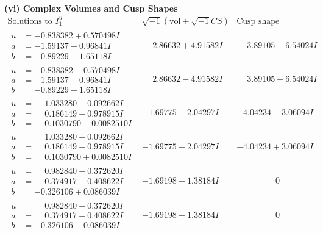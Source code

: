 \documentclass[1p]{elsarticle_modified}
\theoremstyle{definition}
\newcommand{\I}{\sqrt{-1}}
\begin{document}
\newpage\flushleft \textbf{(vi) Complex Volumes and Cusp Shapes}
$$\begin{array}{c|c|c}  
\text{Solutions to }I^u_{1}& \I (\text{vol} + \sqrt{-1}CS) & \text{Cusp shape}\\
 \hline 
\begin{aligned}
u &= -0.838382 + 0.570498 I \\
a &= -1.59137 + 0.96841 I \\
b &= -0.89229 + 1.65118 I\end{aligned}
 & \phantom{-}2.86632 + 4.91582 I & \phantom{-}3.89105 - 6.54024 I \\ \hline\begin{aligned}
u &= -0.838382 - 0.570498 I \\
a &= -1.59137 - 0.96841 I \\
b &= -0.89229 - 1.65118 I\end{aligned}
 & \phantom{-}2.86632 - 4.91582 I & \phantom{-}3.89105 + 6.54024 I \\ \hline\begin{aligned}
u &= \phantom{-}1.033280 + 0.092662 I \\
a &= \phantom{-}0.186149 - 0.978915 I \\
b &= \phantom{-}0.1030790 - 0.0082510 I\end{aligned}
 & -1.69775 + 2.04297 I & -4.04234 - 3.06094 I \\ \hline\begin{aligned}
u &= \phantom{-}1.033280 - 0.092662 I \\
a &= \phantom{-}0.186149 + 0.978915 I \\
b &= \phantom{-}0.1030790 + 0.0082510 I\end{aligned}
 & -1.69775 - 2.04297 I & -4.04234 + 3.06094 I \\ \hline\begin{aligned}
u &= \phantom{-}0.982840 + 0.372620 I \\
a &= \phantom{-}0.374917 + 0.408622 I \\
b &= -0.326106 + 0.086039 I\end{aligned}
 & -1.69198 - 1.38184 I & \phantom{-0.000000 } 0 \\ \hline\begin{aligned}
u &= \phantom{-}0.982840 - 0.372620 I \\
a &= \phantom{-}0.374917 - 0.408622 I \\
b &= -0.326106 - 0.086039 I\end{aligned}
 & -1.69198 + 1.38184 I & \phantom{-0.000000 } 0 \\ \hline\begin{aligned}

\end{aligned}
\end{array}$$
\end{document}
